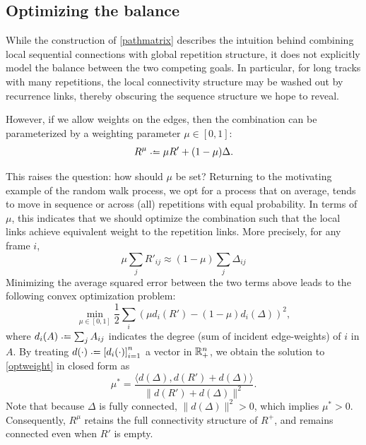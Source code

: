 \documentclass{article}
\begin{document}


\subsection{Optimizing the balance}
While the construction of \cref{pathmatrix} describes the intuition behind combining
local sequential connections with global repetition structure, it does not explicitly
model the balance between the two competing goals.  In particular, for long tracks
with many repetitions, the local connectivity structure may be washed out by
recurrence links, thereby obscuring the sequence structure we hope to reveal.

However, if we allow weights on the edges, then the combination can be parameterized 
by a weighting parameter $\mu \in [0, 1]$:
\begin{equation}
R^\mu \defeq \mu R' + (1 - \mu) \Delta. \label{weightedsum}
\end{equation}

This raises the question: how should $\mu$ be set?  Returning to the motivating
example of the random walk process, we opt for a process that on average, tends to
move in sequence or across (all) repetitions with equal probability.  In terms of
$\mu$, this indicates that we should optimize the combination such that the local
links achieve equivalent weight to the repetition links.  More precisely, for any 
frame $i$,
$$
\mu \sum_j R'_{ij} \approx (1-\mu) \sum_j \Delta_{ij} 
$$
Minimizing the average squared error between the two terms above leads to the
following convex optimization problem:
\begin{equation}
\min_{\mu \in [0, 1]} \frac{1}{2} \sum_i {(\mu d_i(R') - (1 - \mu)d_i(\Delta))}^2,\label{optweight}
\end{equation}
where $d_i(A) \defeq \sum_j A_{ij}$ indicates the degree (sum of incident edge-weights) 
of $i$ in $A$. By treating $d(\cdot) \defeq {[d_i(\cdot)]}_{i=1}^n$ a vector in 
$\mathbb{R}^n_+$, we obtain the solution to \cref{optweight} in closed form as
\begin{equation}
\mu^* = \frac{\langle d(\Delta), d(R') + d(\Delta)\rangle}{\|d(R') +
d(\Delta)\|^2}.\label{optweight:solution}
\end{equation}
Note that because $\Delta$ is fully connected, $\|d(\Delta)\|^2 > 0$, which implies
$\mu^* > 0$.  Consequently, $R^\mu$ retains the full connectivity structure
of $R^+$, and remains connected even when $R'$ is empty.
\end{document}
